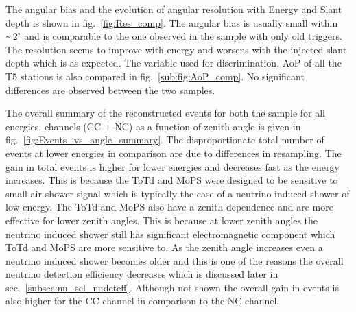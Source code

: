The angular bias and the evolution of angular resolution with Energy and Slant depth is shown in fig.~\ref{fig:Res_comp}. The angular bias is usually small within $\sim 2^{\circ}$ and is comparable to the one observed in the sample with only old triggers. The resolution seems to improve with energy and worsens with the injected slant depth which is as expected. The variable used for discrimination, AoP of all the T5 stations is also compared in fig.~\ref{sub:fig:AoP_comp}. No significant differences are observed between the two samples. 

The overall summary of the reconstructed events for both the sample for all energies, channels (CC + NC) as a function of zenith angle is given in fig.~\ref{fig:Events_vs_angle_summary}. The disproportionate total number of events at lower energies in comparison are due to differences in resampling. The gain in total events is higher for lower energies and decreases fast as the energy increases. This is because the ToTd and MoPS were designed to be sensitive to small air shower signal which is typically the case of a neutrino induced shower of low energy. The ToTd and MoPS also have a zenith dependence and are more effective for lower zenith angles. This is because at lower zenith angles the neutrino induced shower still has significant electromagnetic component which ToTd and MoPS are more sensitive to. As the zenith angle increases even a neutrino induced shower becomes older and this is one of the reasons the overall neutrino detection efficiency decreases which is discussed later in sec.~\ref{subsec:nu_sel_nudeteff}. Although not shown the overall gain in events is also higher for the CC channel in comparison to the NC channel. 

